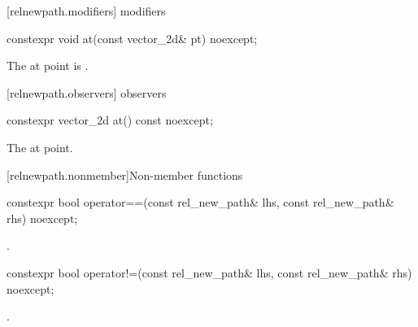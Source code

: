  [relnewpath.modifiers]{ modifiers}%

%
\begin{itemdecl}
constexpr void at(const vector_2d& pt) noexcept;
\end{itemdecl}
\begin{itemdescr}
\pnum
\effects
The at point is .
\end{itemdescr}

 [relnewpath.observers]{ observers}%

%
\begin{itemdecl}
constexpr vector_2d at() const noexcept;
\end{itemdecl}
\begin{itemdescr}
\pnum
\returns
The at point.
\end{itemdescr}

 [relnewpath.nonmember]{Non-member functions}%

%
\begin{itemdecl}
constexpr bool operator==(const rel_new_path& lhs, const rel_new_path& rhs) 
  noexcept;
\end{itemdecl}
\begin{itemdescr}
\pnum
\returns
{}.
\end{itemdescr}

%
\begin{itemdecl}
constexpr bool operator!=(const rel_new_path& lhs, const rel_new_path& rhs) 
  noexcept;
\end{itemdecl}
\begin{itemdescr}
\pnum
\returns
{}.
\end{itemdescr}
